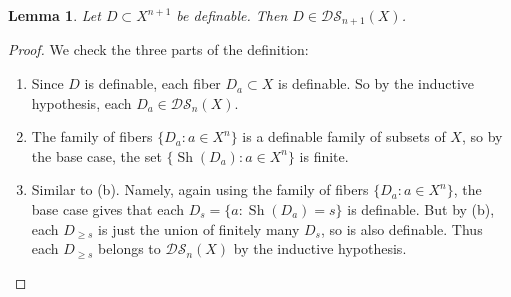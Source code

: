 \documentclass{amsart}
\newtheorem{lemma}[theorem]{Lemma}
\theoremstyle{definition}
\begin{document}
\begin{lemma}\label{L: definably shaped definable case inductive 1}
    Let $D\subset X^{n+1}$ be definable. Then $D\in\mathcal{DS}_{n+1}(X)$.
\end{lemma}
\begin{proof}
    We check the three parts of the definition:
    \begin{enumerate}
        \item[(a)] Since $D$ is definable, each fiber $D_a\subset X$ is definable. So by the inductive hypothesis, each $D_a\in\mathcal{DS}_n(X)$.
        \item[(b)] The family of fibers $\{D_a:a\in X^n\}$ is a definable family of subsets of $X$, so by the base case, the set $\{\operatorname{Sh}(D_a):a\in X^n\}$ is finite.
        \item[(c)] Similar to (b). Namely, again using the family of fibers $\{D_a:a\in X^n\}$, the base case gives that each $D_s=\{a:\operatorname{Sh}(D_a)=s\}$ is definable. But by (b), each $D_{\geq s}$ is just the union of finitely many $D_s$, so is also definable. Thus each $D_{\geq s}$ belongs to $\mathcal{DS}_n(X)$ by the inductive hypothesis.
        \end{enumerate}
\end{proof}
\end{document}
